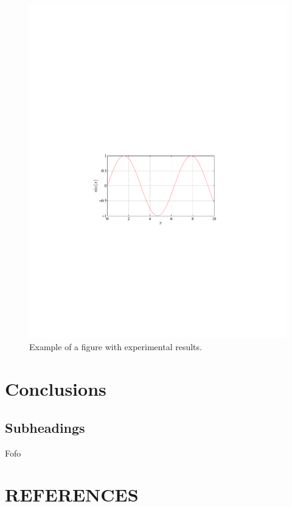 \documentclass{article}
\begin{document}
\begin{sloppy}
\begin{figure}[t]
  \centering
  \centerline{\includegraphics[width=\columnwidth]{fig1a}}
  \caption{Example of a figure with experimental results.}
  \label{fig:results}
\end{figure}


\section{Conclusions}
\label{sec:conclusions}


\subsection{Subheadings}
\label{ssec:subhead}

Fofo


\section{REFERENCES}
\label{sec:ref}






\end{sloppy}
\end{document}
